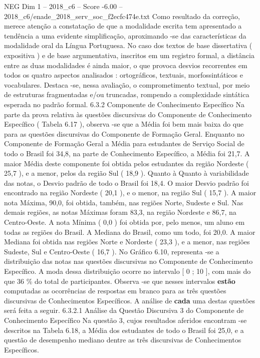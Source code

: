 \begin{textsample}{NEG Dim 1 – 2018\_c6 – Score -6.00 – 2018\_c6/enade\_2018\_serv\_soc\_f2ecfc474e.txt}
Como resultado da correção, merece atenção a constatação de que a modalidade escrita tem apresentado a tendência a uma evidente simplificação, aproximando -se das características da modalidade oral da Língua Portuguesa.
No caso dos textos de base dissertativa ( expositiva ) e de base argumentativa, inscritos em um registro formal, a distância entre as duas modalidades é ainda maior, o que provoca desvios recorrentes em todos os quatro aspectos analisados : ortográficos, textuais, morfossintáticos e vocabulares.
Destaca -se, nessa avaliação, o comprometimento textual, por meio de estruturas fragmentadas e/ou truncadas, rompendo a complexidade sintática esperada no padrão formal. 6.3.2 Componente de Conhecimento Específico Na parte da prova relativa às questões discursivas do Componente de Conhecimento Específico ( Tabela 6.17 ), observa -se que a Média foi bem mais baixa do que para as questões discursivas do Componente de Formação Geral.
Enquanto no Componente de Formação Geral a Média para estudantes de Serviço Social de todo o Brasil foi 34,8, na parte de Conhecimento Específico, a Média foi 21,7.
A maior Média deste componente foi obtida pelos estudantes da região Nordeste ( 25,7 ), e a menor, pelos da região Sul ( 18,9 ).
Quanto à Quanto à variabilidade das notas, o Desvio padrão de todo o Brasil foi 18,4.
O maior Desvio padrão foi encontrado na região Nordeste ( 20,1 ), e o menor, na região Sul ( 15,7 ).
A maior nota Máxima, 90,0, foi obtida, também, nas regiões Norte, Sudeste e Sul.
Nas demais regiões, as notas Máximas foram 83,3, na região Nordeste e 86,7, na Centro-Oeste.
A nota Mínima ( 0,0 ) foi obtida por, pelo menos, um aluno em todas as regiões do Brasil.
A Mediana do Brasil, como um todo, foi 20,0.
A maior Mediana foi obtida nas regiões Norte e Nordeste ( 23,3 ), e a menor, nas regiões Sudeste, Sul e Centro-Oeste ( 16,7 ).
No Gráfico 6.10, representa -se a distribuição das notas nas questões discursivas no Componente de Conhecimento Específico.
A moda dessa distribuição ocorre no intervalo [ 0 ; 10 ], com mais do que 36 \% do total de participantes.
Observa -se que nesses intervalos \textbf{estão} computadas as ocorrências de respostas em branco para as três questões discursivas de Conhecimentos Específicos.
A análise de \textbf{cada} uma destas questões será feita a seguir. 6.3.2.1 Análise da Questão Discursiva 3 do Componente de Conhecimento Específico Na questão 3, cujos resultados aferidos encontram -se descritos na Tabela 6.18, a Média dos estudantes de todo o Brasil foi 25,0, e a questão de desempenho mediano dentre as três discursivas de Conhecimentos Específicos.

\end{textsample}
